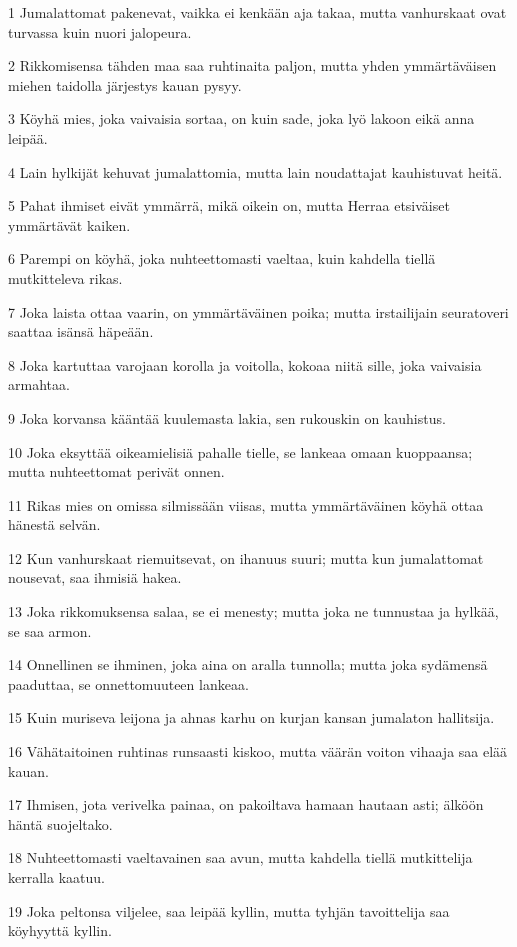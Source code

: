 \par 1 Jumalattomat pakenevat, vaikka ei kenkään aja takaa, mutta vanhurskaat ovat turvassa kuin nuori jalopeura.
\par 2 Rikkomisensa tähden maa saa ruhtinaita paljon, mutta yhden ymmärtäväisen miehen taidolla järjestys kauan pysyy.
\par 3 Köyhä mies, joka vaivaisia sortaa, on kuin sade, joka lyö lakoon eikä anna leipää.
\par 4 Lain hylkijät kehuvat jumalattomia, mutta lain noudattajat kauhistuvat heitä.
\par 5 Pahat ihmiset eivät ymmärrä, mikä oikein on, mutta Herraa etsiväiset ymmärtävät kaiken.
\par 6 Parempi on köyhä, joka nuhteettomasti vaeltaa, kuin kahdella tiellä mutkitteleva rikas.
\par 7 Joka laista ottaa vaarin, on ymmärtäväinen poika; mutta irstailijain seuratoveri saattaa isänsä häpeään.
\par 8 Joka kartuttaa varojaan korolla ja voitolla, kokoaa niitä sille, joka vaivaisia armahtaa.
\par 9 Joka korvansa kääntää kuulemasta lakia, sen rukouskin on kauhistus.
\par 10 Joka eksyttää oikeamielisiä pahalle tielle, se lankeaa omaan kuoppaansa; mutta nuhteettomat perivät onnen.
\par 11 Rikas mies on omissa silmissään viisas, mutta ymmärtäväinen köyhä ottaa hänestä selvän.
\par 12 Kun vanhurskaat riemuitsevat, on ihanuus suuri; mutta kun jumalattomat nousevat, saa ihmisiä hakea.
\par 13 Joka rikkomuksensa salaa, se ei menesty; mutta joka ne tunnustaa ja hylkää, se saa armon.
\par 14 Onnellinen se ihminen, joka aina on aralla tunnolla; mutta joka sydämensä paaduttaa, se onnettomuuteen lankeaa.
\par 15 Kuin muriseva leijona ja ahnas karhu on kurjan kansan jumalaton hallitsija.
\par 16 Vähätaitoinen ruhtinas runsaasti kiskoo, mutta väärän voiton vihaaja saa elää kauan.
\par 17 Ihmisen, jota verivelka painaa, on pakoiltava hamaan hautaan asti; älköön häntä suojeltako.
\par 18 Nuhteettomasti vaeltavainen saa avun, mutta kahdella tiellä mutkittelija kerralla kaatuu.
\par 19 Joka peltonsa viljelee, saa leipää kyllin, mutta tyhjän tavoittelija saa köyhyyttä kyllin.
